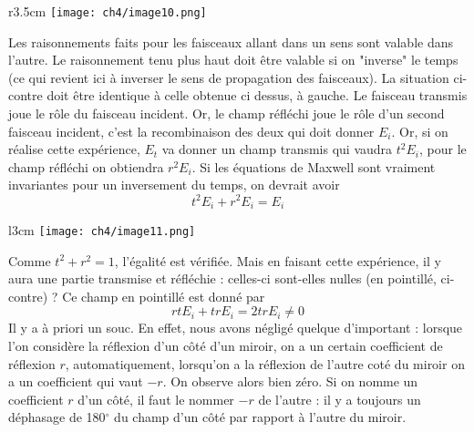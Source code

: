 	\begin{wrapfigure}[7]{r}{3.5cm}
	\vspace{-5mm}
	\texttt{[image: ch4/image10.png]}
	\end{wrapfigure}
Les raisonnements faits pour les faisceaux allant dans un sens sont valable dans l'autre. Le 
raisonnement tenu plus haut doit être valable si on "inverse" le temps (ce qui revient ici à 
inverser le sens de propagation des faisceaux). La situation ci-contre doit être identique à 
celle obtenue ci dessus, à gauche. Le faisceau transmis joue le rôle du faisceau incident. Or, 
le champ réfléchi joue le rôle d'un second faisceau incident, c'est la recombinaison des 
deux qui doit donner $E_i$. Or, si on réalise cette expérience, $E_t$ va donner un champ transmis
qui vaudra $t^2 E_i$, pour le champ réfléchi on obtiendra $r^2 E_i$. Si les équations de 
Maxwell sont vraiment invariantes pour un inversement du temps, on devrait avoir
\begin{equation}
t^2E_i+r^2E_i = E_i
\end{equation}

	\begin{wrapfigure}[6]{l}{3cm}%
	\vspace{-15mm}
	\texttt{[image: ch4/image11.png]}
	\end{wrapfigure}
Comme $t^2+r^2=1$, l'égalité est vérifiée. Mais en faisant cette expérience, il y aura une 
partie transmise et réfléchie : celles-ci sont-elles nulles (en pointillé, ci-contre) ? Ce 
champ en pointillé est donné par
\begin{equation}
rtE_i + trE_i = 2tr E_i \neq 0
\end{equation}
Il y a à priori un souc. En effet, nous avons négligé quelque d'important : lorsque l'on 
considère la réflexion d'un côté d'un miroir, on a un certain coefficient de réflexion $r$, 
automatiquement, lorsqu'on a la réflexion de l'autre coté du miroir on a un coefficient qui 
vaut $-r$. On observe alors bien zéro. Si on nomme un coefficient $r$ d'un côté, il faut le 
nommer $-r$ de l'autre : il y a toujours un déphasage de 180$^\circ$ du champ d'un côté par 
rapport à l'autre du miroir. \\

